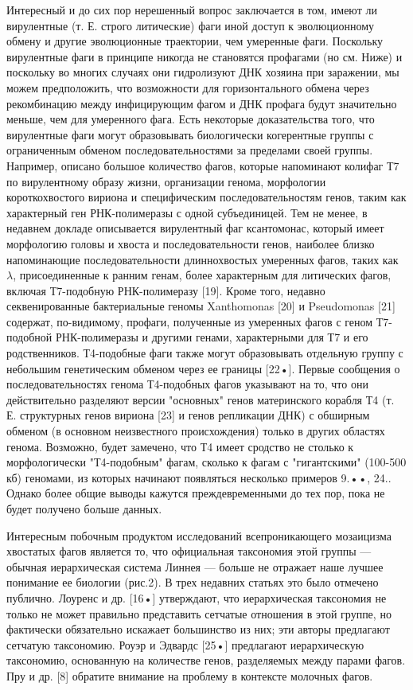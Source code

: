 \documentclass[a4paper,12pt]{article}
\begin{document}
    \par{Интересный и до сих пор нерешенный вопрос заключается в том, имеют ли вирулентные (т. Е. строго литические)
    фаги иной доступ к эволюционному обмену и другие эволюционные траектории, чем умеренные фаги. Поскольку вирулентные
    фаги в принципе никогда не становятся профагами (но см. Ниже) и поскольку во многих случаях они гидролизуют ДНК
    хозяина при заражении, мы можем предположить, что возможности для горизонтального обмена через рекомбинацию между
    инфицирующим фагом и ДНК профага будут значительно меньше, чем для умеренного фага. Есть некоторые доказательства
    того, что вирулентные фаги могут образовывать биологически когерентные группы с ограниченным обменом
    последовательностями за пределами своей группы. Например, описано большое количество фагов, которые напоминают
    колифаг Т7 по вирулентному образу жизни, организации генома, морфологии короткохвостого вириона и специфическим
    последовательностям генов, таким как характерный ген РНК-полимеразы с одной субъединицей. Тем не менее, в недавнем
    докладе описывается вирулентный фаг ксантомонас, который имеет морфологию головы и хвоста и последовательности
    генов, наиболее близко напоминающие последовательности длиннохвостых умеренных фагов, таких как $\lambda$, присоединенные к
    ранним генам, более характерным для литических фагов, включая Т7-подобную РНК-полимеразу [19]. Кроме того, недавно
    секвенированные бактериальные геномы Xanthomonas [20] и Pseudomonas [21] содержат, по-видимому, профаги, полученные
    из умеренных фагов с геном Т7-подобной РНК-полимеразы и другими генами, характерными для Т7 и его родственников.
    Т4-подобные фаги также могут образовывать отдельную группу с небольшим генетическим обменом через ее границы [22•].
    Первые сообщения о последовательностях генома Т4-подобных фагов указывают на то, что они действительно разделяют
    версии "основных" генов материнского корабля Т4 (т. Е. структурных генов вириона [23] и генов репликации ДНК) с
    обширным обменом (в основном неизвестного происхождения) только в других областях генома. Возможно, будет замечено,
    что Т4 имеет сродство не столько к морфологически "Т4-подобным" фагам, сколько к фагам с "гигантскими" (100-500 кб) 
    геномами, из которых начинают появляться несколько примеров 9.••, 24.. Однако более общие выводы кажутся
    преждевременными до тех пор, пока не будет получено больше данных.}
    
    \par{Интересным побочным продуктом исследований всепроникающего мозаицизма хвостатых фагов является то, что
    официальная таксономия этой группы — обычная иерархическая система Линнея — больше не отражает наше лучшее понимание
    ее биологии (рис.2). В трех недавних статьях это было отмечено публично. Лоуренс и др. [16•] утверждают, что
    иерархическая таксономия не только не может правильно представить сетчатые отношения в этой группе, но фактически
    обязательно искажает большинство из них; эти авторы предлагают сетчатую таксономию. Роуэр и Эдвардс [25•] предлагают
    иерархическую таксономию, основанную на количестве генов, разделяемых между парами фагов. Пру и др. [8] обратите 
    внимание на проблему в контексте молочных фагов.}
    
\end{document}
